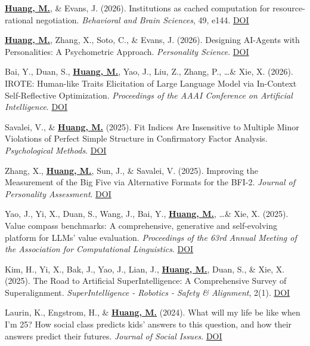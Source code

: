 \documentclass[11pt,letterpaper]{article}
\newcommand{\myname}[1]{\textbf{\uline{#1}}}
\begin{document}
\begin{enumerate}[label={[\arabic*]}]
    \item \myname{Huang, M.}, \& Evans, J. (2026). Institutions as cached computation for resource-rational negotiation. \textit{Behavioral and Brain Sciences}, 49, e144. \href{https://doi.org/10.1017/S0140525X2510174X}{DOI}
    \item \myname{Huang, M.}, Zhang, X., Soto, C., \& Evans, J. (2026). Designing AI-Agents with Personalities: A Psychometric Approach. \textit{Personality Science}. \href{https://doi.org/10.1177/27000710251406471}{DOI}
    \item Bai, Y., Duan, S., \myname{Huang, M.}, Yao, J., Liu, Z., Zhang, P., \ldots \& Xie, X. (2026). IROTE: Human-like Traits Elicitation of Large Language Model via In-Context Self-Reflective Optimization. \textit{Proceedings of the AAAI Conference on Artificial Intelligence}. \href{https://doi.org/10.1609/aaai.v40i36.40252}{DOI}
    \item Savalei, V., \& \myname{Huang, M.} (2025). Fit Indices Are Insensitive to Multiple Minor Violations of Perfect Simple Structure in Confirmatory Factor Analysis. \textit{Psychological Methods}. \href{https://dx.doi.org/10.1037/met0000718}{DOI}
    \item Zhang, X., \myname{Huang, M.}, Sun, J., \& Savalei, V. (2025). Improving the Measurement of the Big Five via Alternative Formats for the BFI-2. \textit{Journal of Personality Assessment}. \href{https://doi.org/10.1080/00223891.2025.2531187}{DOI}
    \item Yao, J., Yi, X., Duan, S., Wang, J., Bai, Y., \myname{Huang, M.}, \ldots \& Xie, X. (2025). Value compass benchmarks: A comprehensive, generative and self-evolving platform for LLMs' value evaluation. \textit{Proceedings of the 63rd Annual Meeting of the Association for Computational Linguistics}. \href{https://doi.org/10.18653/v1/2025.acl-demo.64}{DOI}
    \item Kim, H., Yi, X., Bak, J., Yao, J., Lian, J., \myname{Huang, M.}, Duan, S., \& Xie, X. (2025). The Road to Artificial SuperIntelligence: A Comprehensive Survey of Superalignment. \textit{SuperIntelligence - Robotics - Safety \& Alignment}, 2(1). \href{https://doi.org/10.70777/si.v2i1.13963}{DOI}
    \item Laurin, K., Engstrom, H., \& \myname{Huang, M.} (2024). What will my life be like when I'm 25? How social class predicts kids' answers to this question, and how their answers predict their futures. \textit{Journal of Social Issues}. \href{https://doi.org/10.1111/josi.12650}{DOI}
\end{enumerate}
\end{document}
